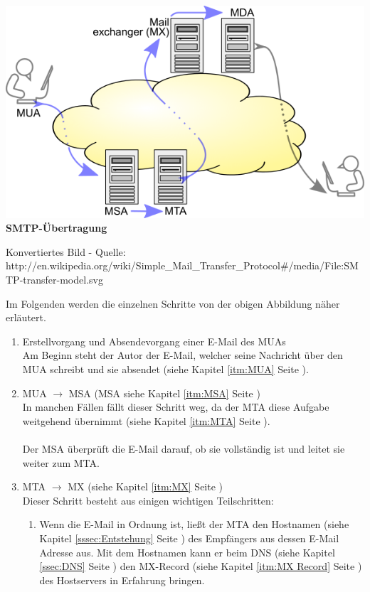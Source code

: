 \documentclass[12pt,a4paper]{report}
\begin{document}
\begin{onehalfspace}
\begin{center}
\includegraphics[scale=0.5]{../docs/lyaton/graphics/SMTP-Uebertragung.png}\\
\textbf{SMTP-Übertragung}\\
\begin{scriptsize}
Konvertiertes Bild - Quelle:\\
http://en.wikipedia.org/wiki/Simple\_Mail\_Transfer\_Protocol\#/media/File:SMTP-transfer-model.svg
\end{scriptsize}
\end{center}
Im Folgenden werden die einzelnen Schritte von der obigen Abbildung näher erläutert. 
\begin{enumerate}
\item Erstellvorgang und Absendevorgang einer E-Mail des MUAs\\
Am Beginn steht der  Autor der E-Mail, welcher seine Nachricht über den MUA schreibt und sie absendet (siehe Kapitel \ref{itm:MUA} Seite \pageref{itm:MUA}).
\item MUA $\rightarrow$ MSA (MSA siehe Kapitel \ref{itm:MSA} Seite \pageref{itm:MSA})\\
In manchen Fällen fällt dieser Schritt weg, da der MTA diese Aufgabe weitgehend übernimmt (siehe Kapitel \ref{itm:MTA} Seite \pageref{itm:MTA}).\\\\
Der MSA überprüft die E-Mail darauf, ob sie vollständig ist und leitet sie weiter zum MTA.
\item MTA $\rightarrow$ MX  (siehe Kapitel \ref{itm:MX} Seite \pageref{itm:MX})\\
Dieser Schritt besteht aus einigen wichtigen Teilschritten:
\begin{enumerate}
\item Wenn die E-Mail in Ordnung ist, ließt der MTA den Hostnamen (siehe Kapitel \ref{sssec:Entstehung} Seite \pageref{sssec:Entstehung}) des Empfängers aus dessen E-Mail Adresse aus. Mit dem Hostnamen kann er beim DNS (siehe Kapitel \ref{ssec:DNS} Seite \pageref{ssec:DNS}) den MX-Record (siehe Kapitel \ref{itm:MX Record} Seite \pageref{itm:MX Record}) des Hostservers in Erfahrung bringen.

\end{enumerate}
\end{enumerate}
\end{onehalfspace}
\end{document}
